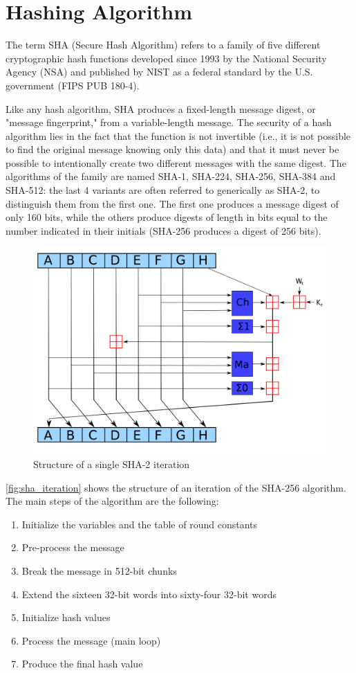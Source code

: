 \section{Hashing Algorithm}
The term SHA (Secure Hash Algorithm) refers to a family of five different cryptographic hash functions developed since 1993 by the National Security Agency (NSA) and published by NIST as a federal standard by the U.S. government (FIPS PUB 180-4).

Like any hash algorithm, SHA produces a fixed-length message digest, or "message fingerprint," from a variable-length message. The security of a hash algorithm lies in the fact that the function is not invertible (i.e., it is not possible to find the original message knowing only this data) and that it must never be possible to intentionally create two different messages with the same digest. The algorithms of the family are named SHA-1, SHA-224, SHA-256, SHA-384 and SHA-512: the last 4 variants are often referred to generically as SHA-2, to distinguish them from the first one. The first one produces a message digest of only 160 bits, while the others produce digests of length in bits equal to the number indicated in their initials (SHA-256 produces a digest of 256 bits).

\begin{figure}[ht]
		\centering
		\includegraphics[width=.7\textwidth]{img/sha_iteration.png}
		\caption{Structure of a single SHA-2 iteration}
		\label{fig:sha_iteration}
\end{figure}

\autoref{fig:sha_iteration} shows the structure of an iteration of the SHA-256 algorithm. The main steps of the algorithm are the following:
\begin{enumerate}
	\item Initialize the variables and the table of round constants
	\item Pre-process the message
	\item Break the message in 512-bit chunks
	\item Extend the sixteen 32-bit words into sixty-four 32-bit words
	\item Initialize hash values
	\item Process the message (main loop)
	\item Produce the final hash value
\end{enumerate}
